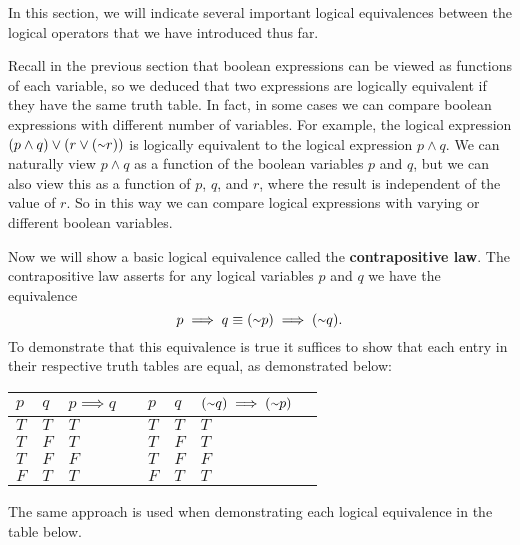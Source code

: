 In this section, we will indicate several important logical equivalences between the logical operators that we have introduced thus far. 

Recall in the previous section that boolean expressions can be viewed as functions of each variable, so we deduced that  two expressions are logically equivalent if they have the same truth table. In fact, in some cases we can compare boolean expressions with different number of variables. For example, the logical expression $(p \land q) \lor (r \lor (\shortsim r))$ is logically equivalent to the logical expression $p \land q$. We can naturally view $p \land q$ as a function of the boolean variables $p$ and $q$, but we can also view this as a function of $p$, $q$, and $r$, where the result is independent of the value of $r$. So in this way we can compare logical expressions with varying or different boolean variables.

Now we will show a basic logical equivalence called the \textbf{contrapositive law}. The contrapositive law asserts for any logical variables $p$ and $q$ we have the equivalence
\[p \implies q \equiv (\shortsim p) \implies (\shortsim q).\]
To demonstrate that this equivalence is true it suffices to show that each entry in their respective truth tables are equal, as demonstrated below:

\begin{table}[h]
\centering
\begin{tabular}{|l|l|l|l|l|l|l|l|}
\hline
$p$ & $q$ & $p \implies q$ & & $p$ & $q$ & $(\shortsim q) \implies (\shortsim p)$ \\ \hline
$T$ & $T$ & $T$ & & $T$ & $T$ & $T$ \\ \hline
$T$ & $F$ & $T$ & & $T$ & $F$ & $T$ \\ \hline
$T$ & $F$ & $F$ & & $T$ & $F$ & $F$ \\ \hline
$F$ & $T$ & $T$ & & $F$ & $T$ & $T$ \\ \hline
\end{tabular}
\end{table}

The same approach is used when demonstrating each logical equivalence in the table below. 


